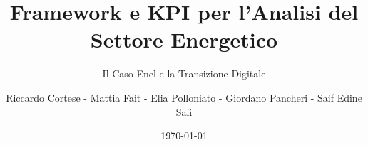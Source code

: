 \title{Framework e KPI per l'Analisi del Settore Energetico}
\subtitle{Il Caso Enel e la Transizione Digitale}

\author{Riccardo Cortese -  Mattia Fait - Elia Polloniato - Giordano Pancheri - Saif Edine Safi}

\date{\today}

